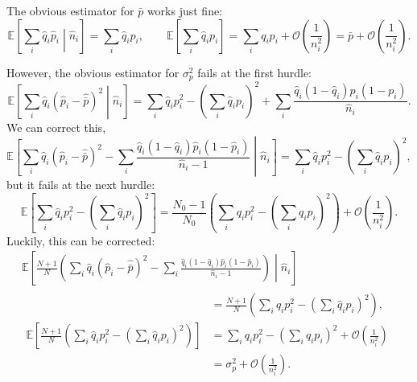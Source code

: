\documentclass[12pt]{article}
\newcommand{\E}{\mathbb{E}}
\newcommand{\CO}{\mathcal{O}}
\newcommand{\prn}[1]{\left ( #1 \right )}
\newcommand{\brk}[1]{\left [ #1 \right ]}
\begin{document}
The obvious estimator for $\bar{p}$ works just fine:
%
\begin{equation}\label{eq:pbarest}
  \E\brk{\sum_i\hat{q}_i\hat{p}_i\middle|\hat{n}_i} = \sum_i \hat{q}_ip_i,
  \qquad
  \E\brk{\sum_i\hat{q}_ip_i}  = \sum_iq_ip_i + \CO\prn{\frac{1}{n_i^2}} = \bar{p} + \CO\prn{\frac{1}{n_i^2}}.
\end{equation}
%

However, the obvious estimator for $\sigma_p^2$ fails at the first hurdle:
%
\begin{equation}\label{eq:sigest1}
  \E\brk{\sum_i\hat{q}_i(\hat{p}_i-\hat{\bar{p}})^2\middle|\hat{n}_i} = \sum_i \hat{q}_i p_i^2 - \prn{\sum_i \hat{q}_ip_i}^2 + \sum_i \frac{\hat{q}_i (1-\hat{q}_i)p_i(1-p_i)}{\hat{n}_i}.
\end{equation}
%
We can correct this,
%
\begin{equation}\label{eq:sigest2}
  \E\brk{\sum_i\hat{q}_i(\hat{p}_i-\hat{\bar{p}})^2 - \sum_i \frac{\hat{q}_i (1-\hat{q}_i)\hat{p}_i(1-\hat{p}_i)}{\hat{n}_i-1} \middle|\hat{n}_i} = \sum_i \hat{q}_i p_i^2 - \prn{\sum_i \hat{q}_ip_i}^2 ,
\end{equation}
%
but it fails at the next hurdle:
%
\begin{equation}\label{eq:sigest3}
  \E\brk{\sum_i \hat{q}_i p_i^2 - \prn{\sum_i \hat{q}_ip_i}^2 } = \frac{N_0-1}{N_0}\prn{\sum_i q_i p_i^2 - \prn{\sum_i q_ip_i}^2} + \CO\prn{\frac{1}{n_i^2}}.
\end{equation}
%
Luckily, this can be corrected:
%
\begin{equation}\label{eq:sigest4}
\begin{aligned}&
  \E\brk{\frac{N+1}{N}\prn{\sum_i\hat{q}_i(\hat{p}_i-\hat{\bar{p}})^2 - \sum_i \frac{\hat{q}_i (1-\hat{q}_i)\hat{p}_i(1-\hat{p}_i)}{\hat{n}_i-1} } \middle|\hat{n}_i}
  \phantom{\sum_i q_i p_i^2 - \prn{\sum_i q_ip_i}} \\
&\begin{aligned}
  &= \frac{N+1}{N}\prn{\sum_i \hat{q}_i p_i^2 - \prn{\sum_i \hat{q}_ip_i}^2} ,\\
  \E\brk{\frac{N+1}{N}\prn{\sum_i \hat{q}_i p_i^2 - \prn{\sum_i \hat{q}_ip_i}^2} } &= \sum_i q_i p_i^2 - \prn{\sum_i q_ip_i}^2 + \CO\prn{\frac{1}{n_i^2}} \\&= \sigma_p^2 + \CO\prn{\frac{1}{n_i^2}}.
\end{aligned}
\end{aligned}
\end{equation}
%
\end{document}
